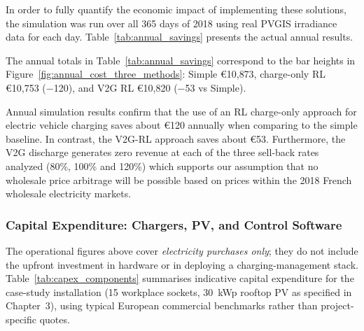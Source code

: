 In order to fully quantify the economic impact of implementing these solutions, the simulation was run over all 365 days of 2018 using real PVGIS irradiance data for each day. Table~\ref{tab:annual_savings} presents the actual annual results.

\begin{table}[H]
\centering
\caption{Annual economic results (365 days, 2018 data)}
\label{tab:annual_savings}
\end{table}

The annual totals in Table~\ref{tab:annual_savings} correspond to the bar heights in Figure~\ref{fig:annual_cost_three_methods}: Simple €10{,}873, charge-only RL €10{,}753 ($-$120), and V2G RL €10{,}820 ($-$53 vs Simple).

Annual simulation results confirm that the use of an RL charge-only approach for electric vehicle charging saves about €120 annually when comparing to the simple baseline. In contrast, the V2G-RL approach saves about €53. Furthermore, the V2G discharge generates zero revenue at each of the three sell-back rates analyzed (80\%, 100\% and 120\%) which supports our assumption that no wholesale price arbitrage will be possible based on prices within the 2018 French wholesale electricity markets.

\subsubsection{Capital Expenditure: Chargers, PV, and Control Software}
\label{subsec:capex_chargers_pv_algorithm}

The operational figures above cover \emph{electricity purchases only}; they do not include the upfront investment in hardware or in deploying a charging-management stack. Table~\ref{tab:capex_components} summarises indicative capital expenditure for the case-study installation (15 workplace sockets, 30~kWp rooftop PV as specified in Chapter~3), using typical European commercial benchmarks rather than project-specific quotes.

